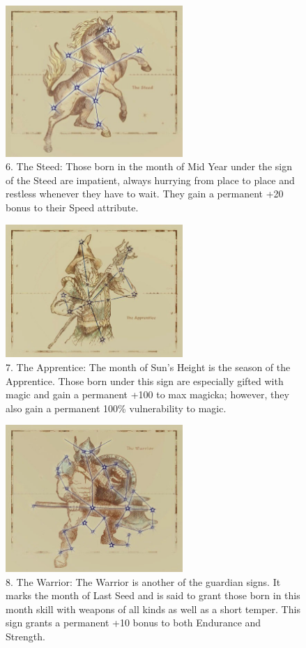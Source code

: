 \documentclass[12pt]{book}
\begin{document}
\begin{figure}[H]
\includegraphics[width=0.6\textwidth]{Steed.png}
\centering
\caption*{6. The Steed: Those born in the month of Mid Year under the sign of the Steed are impatient, always hurrying from place to place and restless whenever they have to wait. They gain a permanent +20 bonus to their Speed attribute.}
\end{figure}

\begin{figure}[H]
\includegraphics[width=0.6\textwidth]{Apprentice.png}
\centering
\caption*{7. The Apprentice: The month of Sun's Height is the season of the Apprentice. Those born under this sign are especially gifted with magic and gain a permanent +100 to max magicka; however, they also gain a permanent 100\% vulnerability to magic.}
\end{figure}

\begin{figure}[H]
\includegraphics[width=0.6\textwidth]{Warrior.png}
\centering
\caption*{8. The Warrior: The Warrior is another of the guardian signs. It marks the month of Last Seed and is said to grant those born in this month skill with weapons of all kinds as well as a short temper. This sign grants a permanent +10 bonus to both Endurance and Strength.}
\end{figure}
\end{document}
